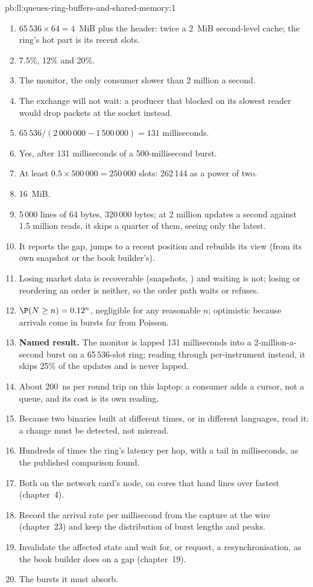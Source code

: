 \begin{solution}{pb:ll:queues-ring-buffers-and-shared-memory:1}
\begin{enumerate}
\item $65\,536 \times 64 = 4$~MiB plus the header: twice a 2~MiB second-level cache; the ring's hot part is its recent slots.
\item 7.5\%, 12\% and 20\%.
\item The monitor, the only consumer slower than 2 million a second.
\item The exchange will not wait: a producer that blocked on its slowest reader would drop packets at the socket instead.
\item $65\,536/(2\,000\,000 - 1\,500\,000) = 131$ milliseconds.
\item Yes, after 131 milliseconds of a 500-millisecond burst.
\item At least $0.5 \times 500\,000 = 250\,000$ slots: 262\,144 as a power of two.
\item 16~MiB.
\item 5\,000 lines of 64 bytes, 320\,000 bytes; at 2 million updates a second against 1.5 million reads, it skips a quarter of them,
seeing only the latest.
\item It reports the gap, jumps to a recent position and rebuilds its view (from its own snapshot or the book builder's).
\item Losing market data is recoverable (snapshots, ) and waiting is not; losing or reordering an order is neither, so the
order path waits or refuses.
\item $\P(N \ge n) = 0.12^n$, negligible for any reasonable $n$; optimistic because arrivals come in bursts far from Poisson.
\item \textbf{Named result.} The monitor is lapped 131 milliseconds into a 2-million-a-second burst on a 65\,536-slot ring; reading
through per-instrument  instead, it skips 25\% of the updates and is never lapped.
\item About \qty{200}{\nano\second} per round trip on this laptop: a consumer adds a cursor, not a queue, and its cost is its own reading.
\item Because two binaries built at different times, or in different languages, read it: a change must be detected, not misread.
\item Hundreds of times the ring's latency per hop, with a tail in milliseconds, as the published comparison found.
\item Both on the network card's node, on cores that hand lines over fastest (chapter~4).
\item Record the arrival rate per millisecond from the capture at the wire (chapter~23) and keep the distribution of burst lengths
and peaks.
\item Invalidate the affected state and wait for, or request, a resynchronisation, as the book builder does on a gap (chapter~19).
\item The bursts it must absorb.
\end{enumerate}
\end{solution}

